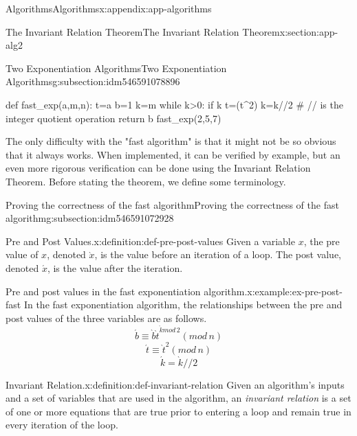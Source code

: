 \documentclass[oneside,10pt,]{book}
\numberwithin{equation}{section}
\begin{document}
\begin{appendixptx}{Algorithms}{}{Algorithms}{}{}{x:appendix:app-algorithms}
\begin{sectionptx}{The Invariant Relation Theorem}{}{The Invariant Relation Theorem}{}{}{x:section:app-alg2}
\begin{subsectionptx}{Two Exponentiation Algorithms}{}{Two Exponentiation Algorithms}{}{}{g:subsection:idm546591078896}
\begin{sageinput}
def fast_exp(a,m,n):
    t=a
    b=1
    k=m
    while k>0:
        if k%
        t=(t^2)%
        k=k//2  # // is the integer quotient operation
    return b    
fast_exp(2,5,7)
\end{sageinput}
The only difficulty with the "fast algorithm" is that it might not be so obvious that it always works.  When implemented, it can be verified by example, but an even more rigorous verification can be done using the Invariant Relation Theorem. Before stating the theorem, we define some terminology.%
\end{subsectionptx}
%
%
\typeout{************************************************}
\typeout{************************************************}
%
\begin{subsectionptx}{Proving the correctness of the fast algorithm}{}{Proving the correctness of the fast algorithm}{}{}{g:subsection:idm546591072928}
\begin{definition}{Pre and Post Values.}{x:definition:def-pre-post-values}%
\label{g:notation:idm546591072112}%
Given a variable \(x\), the pre value of \(x\), denoted \(\grave x\), is the value before an iteration of a loop.  The post value, denoted \(\acute x\), is the value after the iteration.%
\end{definition}
\begin{example}{Pre and post values in the fast exponentiation algorithm.}{x:example:ex-pre-post-fast}%
In the fast exponentiation algorithm, the relationships between the pre and post values of the three variables are as follows.%
\begin{equation*}
\acute{b} \equiv \grave{b} \grave{t}^{\grave{k} mod\,2}(mod\, n)
\end{equation*}
%
\begin{equation*}
\acute{t} \equiv \grave t^2(mod\,n)
\end{equation*}
%
\begin{equation*}
\acute k = \grave k//2
\end{equation*}
%
\end{example}
\begin{definition}{Invariant Relation.}{x:definition:def-invariant-relation}%
Given an algorithm's inputs and a set of variables that are used in the algorithm, an \emph{invariant relation} is a set of one or more equations that are true prior to entering a loop and remain true in every iteration of the loop.%

\end{definition}
\end{subsectionptx}
\end{sectionptx}
\end{appendixptx}
\end{document}
